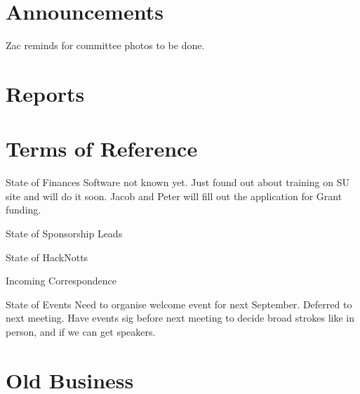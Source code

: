 \documentclass[11pt,hacksoc]{meetingmins}
\begin{document}
\maketitle

\section{Announcements}
\begin{items}
\item Zac reminds for committee photos to be done.

\end{items}

\section{Reports}

\section{Terms of Reference}
\begin{items}
\item {State of Finances}
\subitem Software not known yet. Just found out about training on SU site and will do it soon.
\subitem Jacob and Peter will fill out the application for Grant funding.
\item {State of Sponsorship Leads}
\item {State of HackNotts}
\item {Incoming Correspondence}
\item {State of Events}
\subitem Need to organise welcome event for next September. Deferred to next meeting.
\subitem Have events sig before next meeting to decide broad strokes like in person, and if we can get speakers.
\end{items}

\section{Old Business}
\begin{items}
\item
\end{items}
\end{document}
